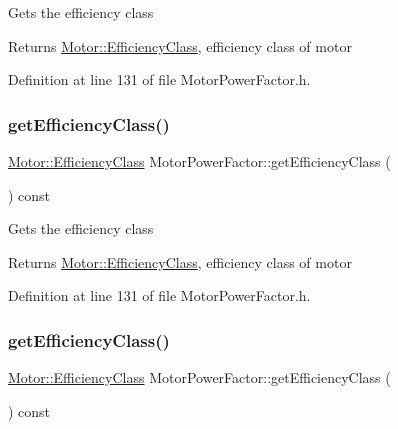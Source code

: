 Gets the efficiency class

\begin{DoxyReturn}{Returns}
\hyperlink{class_motor_afa022971ae062406a9f588c601673d4e}{Motor\+::\+Efficiency\+Class}, efficiency class of motor 
\end{DoxyReturn}


Definition at line 131 of file Motor\+Power\+Factor.\+h.

\mbox{\label{class_motor_power_factor_a1ce98cb6ae9fbf09b05b4b6bd75e5c71}} 
\subsubsection{\texorpdfstring{get\+Efficiency\+Class()}{getEfficiencyClass()}\hspace{0.1cm}{\footnotesize\ttfamily [2/3]}}
{\footnotesize\ttfamily \hyperlink{class_motor_afa022971ae062406a9f588c601673d4e}{Motor\+::\+Efficiency\+Class} Motor\+Power\+Factor\+::get\+Efficiency\+Class (\begin{DoxyParamCaption}{ }\end{DoxyParamCaption}) const\hspace{0.3cm}{\ttfamily [inline]}}

Gets the efficiency class

\begin{DoxyReturn}{Returns}
\hyperlink{class_motor_afa022971ae062406a9f588c601673d4e}{Motor\+::\+Efficiency\+Class}, efficiency class of motor 
\end{DoxyReturn}


Definition at line 131 of file Motor\+Power\+Factor.\+h.

\mbox{\label{class_motor_power_factor_a1ce98cb6ae9fbf09b05b4b6bd75e5c71}} 
\subsubsection{\texorpdfstring{get\+Efficiency\+Class()}{getEfficiencyClass()}\hspace{0.1cm}{\footnotesize\ttfamily [3/3]}}
{\footnotesize\ttfamily \hyperlink{class_motor_afa022971ae062406a9f588c601673d4e}{Motor\+::\+Efficiency\+Class} Motor\+Power\+Factor\+::get\+Efficiency\+Class (\begin{DoxyParamCaption}{ }\end{DoxyParamCaption}) const\hspace{0.3cm}{\ttfamily [inline]}}

